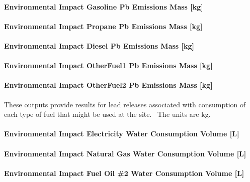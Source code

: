 \paragraph{Environmental Impact Gasoline Pb Emissions Mass {[}kg{]}}\label{environmental-impact-gasoline-pb-emissions-mass-kg}

\paragraph{Environmental Impact Propane Pb Emissions Mass {[}kg{]}}\label{environmental-impact-propane-pb-emissions-mass-kg}

\paragraph{Environmental Impact Diesel Pb Emissions Mass {[}kg{]}}\label{environmental-impact-diesel-pb-emissions-mass-kg}

\paragraph{Environmental Impact OtherFuel1 Pb Emissions Mass {[}kg{]}}\label{environmental-impact-otherfuel1-pb-emissions-mass-kg}

\paragraph{Environmental Impact OtherFuel2 Pb Emissions Mass {[}kg{]}}\label{environmental-impact-otherfuel2-pb-emissions-mass-kg}

These outputs provide results for lead releases associated with consumption of each type of fuel that might be used at the site.~ The units are kg.

\paragraph{Environmental Impact Electricity Water Consumption Volume {[}L{]}}\label{environmental-impact-electricity-water-consumption-volume-l}

\paragraph{Environmental Impact Natural Gas Water Consumption Volume {[}L{]}}\label{environmental-impact-natural-gas-water-consumption-volume-l}

\paragraph{Environmental Impact Fuel Oil \#2 Water Consumption Volume {[}L{]}}\label{environmental-impact-fuel-oil-2-water-consumption-volume-l}

